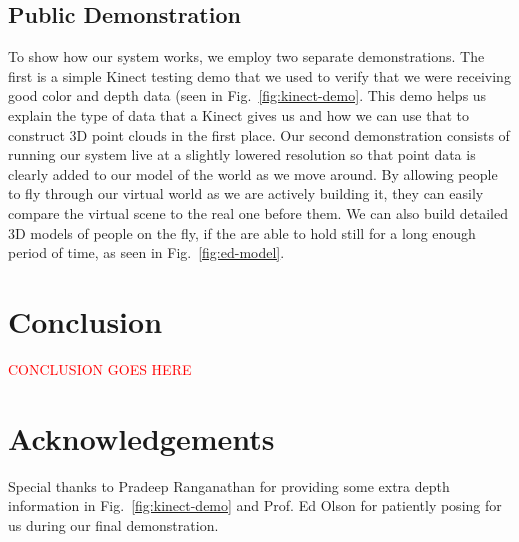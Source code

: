 \documentclass[letterpaper, 10pt, conference]{ieeeconf}
\newcommand{\xxx}[1]{\textcolor{red}{#1}}
\begin{document}
\subsection{Public Demonstration}
To show how our system works, we employ two separate demonstrations. The first
is a simple Kinect testing demo that we used to verify that we were receiving
good color and depth data (seen in Fig.~\ref{fig:kinect-demo}. This demo helps
us explain the type of data that a Kinect gives us and how we can use that to
construct 3D point clouds in the first place. Our second demonstration
consists of running our system live at a slightly lowered resolution so that
point data is clearly added to our model of the world as we move around. By
allowing people to fly through our virtual world as we are actively building
it, they can easily compare the virtual scene to the real one before them. We
can also build detailed 3D models of people on the fly, if the are able to
hold still for a long enough period of time, as seen in Fig.~\ref{fig:ed-model}.

\section{Conclusion}
\xxx{CONCLUSION GOES HERE}

\section*{Acknowledgements}
Special thanks to Pradeep Ranganathan for providing some extra depth
information in Fig.~\ref{fig:kinect-demo} and Prof. Ed Olson for patiently
posing for us during our final demonstration.



\end{document}

